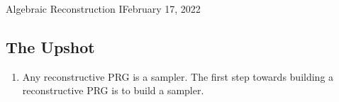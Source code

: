 \begin{lecture}{5}{Algebraic Reconstruction I}{February 17, 2022}\label{lec:05}

\subsection*{The Upshot}

\begin{enumerate}
  \item Any reconstructive PRG is a sampler. The first step towards building a
    reconstructive PRG is to build a sampler.
\end{enumerate}

\end{lecture}
